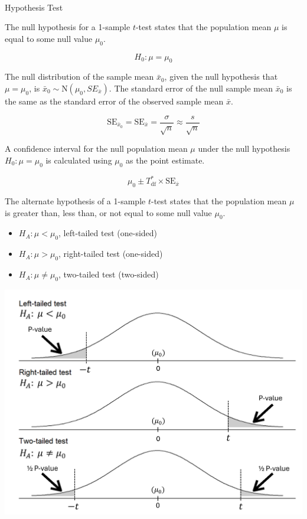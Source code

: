 \documentclass[
  letterpaper,
  DIV=11,
  numbers=noendperiod]{scrartcl}
\makeatletter
\let\oldparagraph\paragraph
\renewcommand{\paragraph}{
    \@ifstar
      \xxxParagraphStar
      \xxxParagraphNoStar
  }
\newcommand{\xxxParagraphStar}[1]{\oldparagraph*{#1}\mbox{}}
\newcommand{\xxxParagraphNoStar}[1]{\oldparagraph{#1}\mbox{}}
\makeatother
\begin{document}
\paragraph{Hypothesis Test}\label{hypothesis-test}

The null hypothesis for a 1-sample \(t\)-test states that the population
mean \(\mu\) is equal to some null value \(\mu_0\).

\[
H_0 \colon \mu=\mu_0
\]

The null distribution of the sample mean \(\bar{x}_0\), given the null
hypothesis that \(\mu=\mu_0\), is
\(\bar{x}_0 \sim \text{N}\left(\mu_0, SE_{\bar{x}}\right)\). The
standard error of the null sample mean \(\bar{x}_0\) is the same as the
standard error of the observed sample mean \(\bar{x}\).

\[
\text{SE}_{\bar{x}_0}=\text{SE}_{\bar{x}}=\frac{\sigma}{\sqrt{n}} \approx \frac{s}{\sqrt{n}}
\]

A confidence interval for the null population mean \(\mu\) under the
null hypothesis \(H_0 \colon \mu=\mu_0\) is calculated using \(\mu_0\)
as the point estimate.

\[
\mu_0 \pm T_{\text{df}}^* \times \text{SE}_{\bar{x}}
\]

The alternate hypothesis of a 1-sample \(t\)-test states that the
population mean \(\mu\) is greater than, less than, or not equal to some
null value \(\mu_0\).

\begin{itemize}
\item
  \(H_A \colon \mu < \mu_0\), left-tailed test (one-sided)
\item
  \(H_A \colon \mu > \mu_0\), right-tailed test (one-sided)
\item
  \(H_A \colon \mu \ne \mu_0\), two-tailed test (two-sided)
\end{itemize}

\includegraphics{cheatsheet_files/mediabag/t-test.png}
\end{document}
